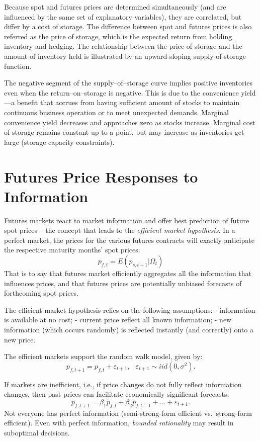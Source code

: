 \documentclass[
]{book}
\begin{document}
Because spot and futures prices are determined simultaneously (and are influenced by the same set of explanatory variables), they are correlated, but differ by a cost of storage. The difference between spot and futures prices is also referred as the price of storage, which is the expected return from holding inventory and hedging. The relationship between the price of storage and the amount of inventory held is illustrated by an upward-sloping supply-of-storage function.

The negative segment of the supply--of--storage curve implies positive inventories even when the return--on--storage is negative. This is due to the convenience yield---a benefit that accrues from having sufficient amount of stocks to maintain continuous business operation or to meet unexpected demands. Marginal convenience yield decreases and approaches zero as stocks increase. Marginal cost of storage remains constant up to a point, but may increase as inventories get large (storage capacity constraints).

\hypertarget{futures-price-responses-to-information}{%
\section{Futures Price Responses to Information}\label{futures-price-responses-to-information}}

Futures markets react to market information and offer best prediction of future spot prices -- the concept that leads to the \emph{efficient market hypothesis}. In a perfect market, the prices for the various futures contracts will exactly anticipate the respective maturity months' spot prices: \[p_{f,t} = E\!\left(p_{s,t+1}|\Omega_t\right)\] That is to say that futures market efficiently aggregates all the information that influences prices, and that futures prices are potentially unbiased forecasts of forthcoming spot prices.

The efficient market hypothesis relies on the following assumptions:
- information is available at no cost;
- current price reflect all known information;
- new information (which occurs randomly) is reflected instantly (and correctly) onto a new price.

The efficient markets support the random walk model, given by: \[p_{f,t+1} = p_{f,t} + \varepsilon_{t+1},\;~~\varepsilon_{t+1}\sim iid\left(0,\sigma^2\right).\]

If markets are inefficient, i.e., if price changes do not fully reflect information changes, then past prices can facilitate economically significant forecasts: \[p_{f,t+1} = \beta_1 p_{f,t} + \beta_2 p_{f,t-1} + \ldots + \varepsilon_{t+1}.\] Not everyone has perfect information (semi-strong-form efficient vs.~strong-form efficient). Even with perfect information, \emph{bounded rationality} may result in suboptimal decisions.
\end{document}
